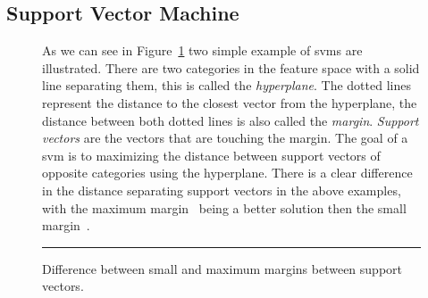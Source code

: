 \subsection{Support Vector Machine}
\label{subsec:background_support_vector_machine}
\begin{figure}[ht]
  \centering
  \qquad
  \caption{Difference between small and maximum margins between support vectors.}
  \vspace{1mm}
  \footnotesize{As we can see in Figure~\ref{fig:SVM_margin} two simple example of \gls{svm}s are illustrated. There are two categories in the feature space with a solid line separating them, this is called the \emph{hyperplane}. The dotted lines represent the distance to the closest vector from the hyperplane, the distance between both dotted lines is also called the \emph{margin}. \emph{Support vectors} are the vectors that are touching the margin. The goal of a \gls{svm} is to maximizing the distance between support vectors of opposite categories using the hyperplane. There is a clear difference in the distance separating support vectors in the above examples, with the maximum margin~ being a better solution then the small margin~.}
  \vspace{2mm}
  \hrule
  \label{fig:SVM_margin}
\end{figure}

